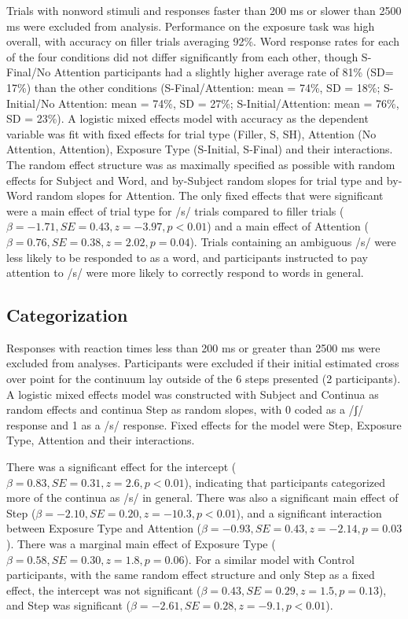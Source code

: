 \documentclass[a4paper,11pt,twocolumn]{article}
\begin{document}
Trials with nonword stimuli and responses faster than 200 ms or slower than 2500 ms were excluded from analysis. Performance on the exposure task was high overall, with accuracy on filler trials averaging 92\%.  Word response rates for each of the four conditions did not differ significantly from each other, though S-Final/No Attention participants had a slightly higher average rate of 81\% (SD= 17\%) than the other conditions (S-Final/Attention: mean = 74\%, SD = 18\%; S-Initial/No Attention: mean = 74\%, SD = 27\%; S-Initial/Attention: mean = 76\%, SD = 23\%).  A logistic mixed effects model with accuracy as the dependent variable was fit with fixed effects for trial type (Filler, S, SH), Attention (No Attention, Attention), Exposure Type (S-Initial, S-Final) and their interactions. The random effect structure was as maximally specified as possible with random effects for Subject and Word, and by-Subject random slopes for trial type and by-Word random slopes for Attention. The only fixed effects that were significant were a main effect of trial type for /s/ trials compared to filler trials ($\beta = -1.71, SE = 0.43, z = -3.97, p < 0.01$) and a main effect of Attention ($\beta = 0.76, SE = 0.38, z = 2.02,   p = 0.04$).  Trials containing an ambiguous /s/ were less likely to be responded to as a word, and participants instructed to pay attention to /s/ were more likely to correctly respond to words in general.

\subsection{Categorization}

Responses with reaction times less than 200 ms or greater than 2500 ms were excluded from analyses. Participants were excluded if their initial estimated cross over point for the continuum lay outside of the 6 steps presented (2 participants).  A logistic mixed effects model was constructed with Subject and Continua as random effects and continua Step as random slopes, with 0 coded as a /ʃ/ response and 1 as a /s/ response.  Fixed effects for the model were Step, Exposure Type, Attention and their interactions.

There was a significant effect for the intercept ($\beta = 0.83, SE = 0.31, z = 2.6, p < 0.01$), indicating that participants categorized more of the continua as /s/ in general.  There was also a significant main effect of Step ($\beta = -2.10, SE = 0.20, z = -10.3, p < 0.01$), and a significant interaction between Exposure Type and Attention ($\beta = -0.93, SE = 0.43, z = -2.14, p = 0.03$).  There was a marginal main effect of Exposure Type ($\beta =0.58, SE = 0.30, z = 1.8, p = 0.06$).  For a similar model with Control participants, with the same random effect structure and only Step as a fixed effect, the intercept was not significant ($\beta = 0.43, SE = 0.29, z = 1.5, p = 0.13$), and Step was significant ($\beta = -2.61, SE = 0.28, z = -9.1, p < 0.01$).
\end{document}
